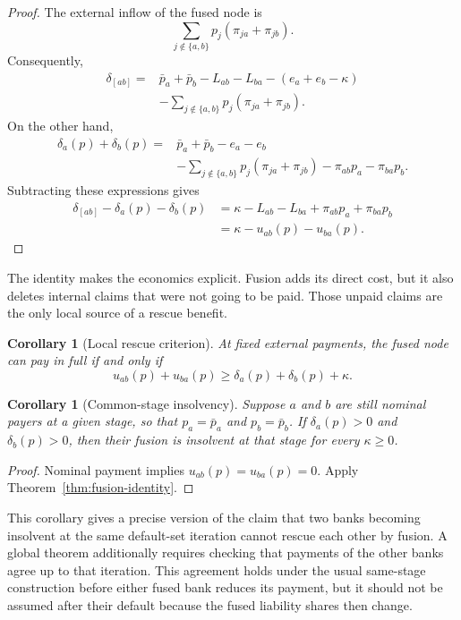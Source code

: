 \documentclass[11pt]{article}
\newtheorem{corollary}[theorem]{Corollary}
\theoremstyle{definition}
\theoremstyle{remark}
\newcommand{\pbar}{\bar p}
\begin{document}
\begin{proof}
The external inflow of the fused node is
\begin{equation}
  \sum_{j\notin\{a,b\}}p_j(\pi_{ja}+\pi_{jb}).
\end{equation}
Consequently,
\begin{align*}
  \delta_{[ab]}
  ={}&\pbar_a+\pbar_b-L_{ab}-L_{ba}
      -(e_a+e_b-\kappa)\\
    &-\sum_{j\notin\{a,b\}}p_j(\pi_{ja}+\pi_{jb}).
\end{align*}
On the other hand,
\begin{align*}
  \delta_a(p)+\delta_b(p)
  ={}&\pbar_a+\pbar_b-e_a-e_b\\
    &-\sum_{j\notin\{a,b\}}p_j(\pi_{ja}+\pi_{jb})
      -\pi_{ab}p_a-\pi_{ba}p_b.
\end{align*}
Subtracting these expressions gives
\begin{align*}
  \delta_{[ab]}-\delta_a(p)-\delta_b(p)
   & =\kappa-L_{ab}-L_{ba}+\pi_{ab}p_a+\pi_{ba}p_b\\
   & =\kappa-u_{ab}(p)-u_{ba}(p).
\end{align*}
\end{proof}

The identity makes the economics explicit.  Fusion adds its direct cost, but
it also deletes internal claims that were not going to be paid.  Those unpaid
claims are the only local source of a rescue benefit.

\begin{corollary}[Local rescue criterion]\label{cor:fusion-rescue}
At fixed external payments, the fused node can pay in full if and only if
\begin{equation}
  u_{ab}(p)+u_{ba}(p)
  \geq \delta_a(p)+\delta_b(p)+\kappa.
\end{equation}
\end{corollary}

\begin{corollary}[Common-stage insolvency]
Suppose $a$ and $b$ are still nominal payers at a given stage, so that
$p_a=\pbar_a$ and $p_b=\pbar_b$.  If
$\delta_a(p)>0$ and $\delta_b(p)>0$, then their fusion is insolvent at that
stage for every $\kappa\geq0$.
\end{corollary}

\begin{proof}
Nominal payment implies $u_{ab}(p)=u_{ba}(p)=0$.  Apply
Theorem~\ref{thm:fusion-identity}.
\end{proof}

This corollary gives a precise version of the claim that two banks becoming
insolvent at the same default-set iteration cannot rescue each other by
fusion.  A global theorem additionally requires checking that payments of the
other banks agree up to that iteration.  This agreement holds under the usual
same-stage construction before either fused bank reduces its payment, but it
should not be assumed after their default because the fused liability shares
then change.
\end{document}
